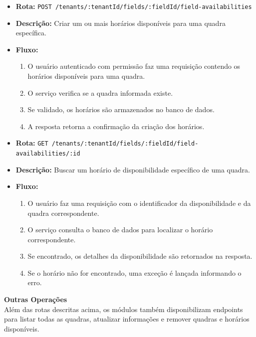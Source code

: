 \begin{itemize}
    \item \textbf{Rota:} \texttt{POST /tenants/:tenantId/fields/:fieldId/field-availabilities}
    \item \textbf{Descrição:} Criar um ou mais horários disponíveis para uma quadra específica.
    \item \textbf{Fluxo:}
    \begin{enumerate}
        \item O usuário autenticado com permissão faz uma requisição contendo os horários disponíveis para uma quadra.
        \item O serviço verifica se a quadra informada existe.
        \item Se validado, os horários são armazenados no banco de dados.
        \item A resposta retorna a confirmação da criação dos horários.
    \end{enumerate}
\end{itemize}

\begin{itemize}
    \item \textbf{Rota:} \texttt{GET /tenants/:tenantId/fields/:fieldId/field-availabilities/:id}
    \item \textbf{Descrição:} Buscar um horário de disponibilidade específico de uma quadra.
    \item \textbf{Fluxo:}
    \begin{enumerate}
        \item O usuário faz uma requisição com o identificador da disponibilidade e da quadra correspondente.
        \item O serviço consulta o banco de dados para localizar o horário correspondente.
        \item Se encontrado, os detalhes da disponibilidade são retornados na resposta.
        \item Se o horário não for encontrado, uma exceção é lançada informando o erro.
    \end{enumerate}
\end{itemize}

\textbf{Outras Operações}\\
Além das rotas descritas acima, os módulos também disponibilizam endpoints para listar todas as quadras, atualizar informações e remover quadras e horários disponíveis.

